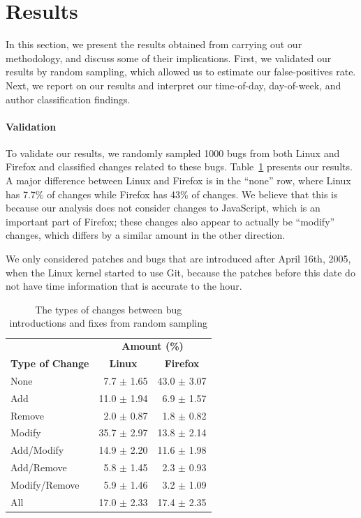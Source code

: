 \section{Results}
\label{sec-results}
In this section, we present the results obtained from carrying out our
methodology, and discuss some of their implications. First, we validated
our results by random sampling, which allowed us to estimate our
false-positives rate. Next, we report on our results and interpret
our time-of-day, day-of-week, and author classification findings.

\paragraph{Validation} 
To validate our results, we randomly sampled 1000 bugs from both Linux
and Firefox and classified changes related to these bugs.
Table~\ref{tbl-changes} presents our results. A major difference
between Linux and Firefox is in the ``none'' row, where Linux has
7.7\% of changes while Firefox has 43\% of changes. We believe that
this is because our analysis does not consider changes to JavaScript,
which is an important part of Firefox; these changes also appear to
actually be ``modify'' changes, which differs by a similar amount
in the other direction.

We only considered patches and bugs that are introduced after April 16th, 2005, when
the Linux kernel started to use Git, because the patches before this date do not have 
time information that is accurate to the hour.


\begin{table}
\begin{center}
\begin{tabular}{l|r|r}
\multicolumn{1}{c}{} & \multicolumn{2}{c}{\textbf{Amount (\%)}} \\
\textbf{Type of Change} & \multicolumn{1}{c|}{\textbf{Linux}} & \multicolumn{1}{c}{\textbf{Firefox}}\\
\hline
None          &  7.7 $\pm$ 1.65 & 43.0 $\pm$ 3.07\\
\hline
Add           & 11.0 $\pm$ 1.94 & 6.9 $\pm$ 1.57\\
\hline
Remove        &  2.0 $\pm$ 0.87 & 1.8 $\pm$ 0.82\\
\hline
Modify        & 35.7 $\pm$ 2.97 & 13.8 $\pm$ 2.14\\
\hline
Add/Modify    & 14.9 $\pm$ 2.20 & 11.6 $\pm$ 1.98\\
\hline
Add/Remove    &  5.8 $\pm$ 1.45 & 2.3 $\pm$ 0.93\\
\hline
Modify/Remove &  5.9 $\pm$ 1.46 & 3.2 $\pm$ 1.09 \\
\hline
All           & 17.0 $\pm$ 2.33 & 17.4 $\pm$ 2.35\\
\end{tabular}
\end{center}
\caption{The types of changes between bug introductions and fixes from random sampling}
\label{tbl-changes}
\end{table}

